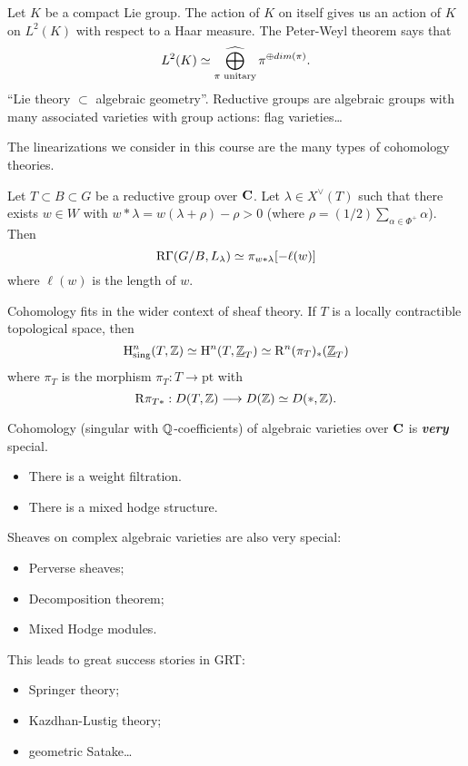 \begin{example}
	Let $K$ be a compact Lie group. The action of $K$ on itself gives us an action of $K$ on $L^2(K)$ with respect to a Haar measure. The Peter-Weyl theorem says that
	\[
	L^2(K) \isoto \cbigoplus_{\pi\text{ unitary}}\pi^{\oplus dim(\pi)}.
	\]
	``Lie theory $\subset $ algebraic geometry''. Reductive groups are algebraic groups with many associated varieties with group actions: flag varieties\dots
\end{example}
The linearizations we consider in this course are the many types of cohomology theories.

\begin{example}
	Let $T\subset B\subset G$ be a reductive group over $\mathbf{C}$. Let $\lambda\in X^{\vee}(T)$ such that there exists $w\in W$ with $w*\lambda = w(\lambda+\rho)-\rho>0$ (where $\rho = (1 /2)\sum_{\alpha\in \Phi^{+}}\alpha$). Then
	\[
		\mathrm{R}\Gamma(G /B,L_\lambda) \simeq \pi_{w*\lambda}[-\ell(w)]
	\] 
	where $\ell(w)$ is the length of $w$.
\end{example}
Cohomology fits in the wider context of sheaf theory. If $T$ is a locally contractible topological space, then
\[
	\mathrm{H}^{n}_{\text{sing}}(T,\mathbb Z) \simeq \mathrm{H}^{n}(T,\underline{\mathbb{Z}}_T) \simeq \mathrm{R}^{n}(\pi_T)_*(\underline{\mathbb{Z}}_T)	
\]
where $\pi_T$ is the morphism $\pi_T:T\to \text{pt}$ with
\[
\RD\pi_{T*}:D(T,\Z) \to D(\Z) \isoto D(*,\Z)
.\] 

Cohomology (singular with $\mathbb Q$-coefficients) of algebraic varieties over $\mathbf{C}$ is \emph{\textbf{very}} special.
\begin{itemize}
	\item There is a weight filtration.
	\item There is a mixed hodge structure.
\end{itemize}
Sheaves on complex algebraic varieties are also very special:
\begin{itemize}
	\item Perverse sheaves;
	\item Decomposition theorem;
	\item Mixed Hodge modules.
\end{itemize}
This leads to great success stories in GRT:
\begin{itemize}
	\item Springer theory;
	\item Kazdhan-Lustig theory;
	\item geometric Satake\dots
\end{itemize}

